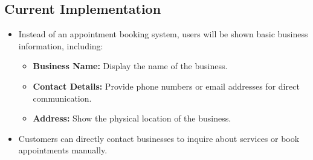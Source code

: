 \subsection{Current Implementation}
\begin{itemize}[leftmargin=*]
    \item Instead of an appointment booking system, users will be shown basic business information, including:
    \begin{itemize}
        \item \textbf{Business Name:} Display the name of the business.
        \item \textbf{Contact Details:} Provide phone numbers or email addresses for direct communication.
        \item \textbf{Address:} Show the physical location of the business.
    \end{itemize}
    \item Customers can directly contact businesses to inquire about services or book appointments manually.
\end{itemize}

